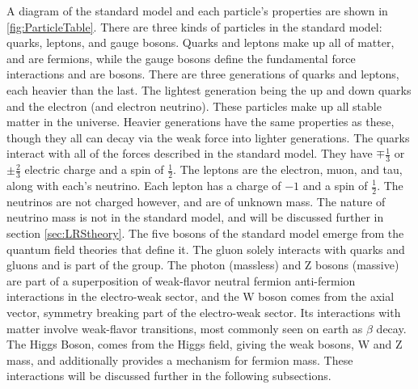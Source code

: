 A diagram of the standard model and each particle's properties are shown in \ref{fig:ParticleTable}.  There are three kinds of particles in the standard model: quarks, leptons, and gauge bosons.  Quarks and leptons make up all of matter, and are fermions, while the gauge bosons define the fundamental force interactions and are bosons. There are three generations of quarks and leptons, each heavier than the last.  The lightest generation being the up and down quarks and the electron (and electron neutrino).  These particles make up all stable matter in the universe.  Heavier generations have the same properties as these, though they all can decay via the weak force into lighter generations. 
The quarks interact with all of the forces described in the standard model.  They have \ensuremath{\mp\frac{1}{3}} or \ensuremath{\pm\frac{2}{3}} electric charge and a spin of \ensuremath{\frac{1}{2}}.
The leptons are the electron, muon, and tau, along with each's neutrino.  Each lepton has a charge of \ensuremath{-1} and a spin of \ensuremath{\frac{1}{2}}.  The neutrinos are not charged however, and are of unknown mass.  The nature of neutrino mass is not in the standard model, and will be discussed further in section \ref{sec:LRStheory}.
The five bosons of the standard model emerge from the quantum field theories that define it.  The gluon solely interacts with quarks and gluons and is part of the \SUthree group.  The photon (massless) and Z bosons (massive) are part of a superposition of weak-flavor neutral fermion anti-fermion interactions in the electro-weak sector, and the W boson comes from the axial vector, symmetry breaking part of the electro-weak sector.  Its interactions with matter involve weak-flavor transitions, most commonly seen on earth as \ensuremath{\beta} decay. The Higgs Boson, comes from the Higgs field, giving the weak bosons, W and Z mass, and additionally provides a mechanism for fermion mass.  These interactions will be discussed further in the following subsections.


